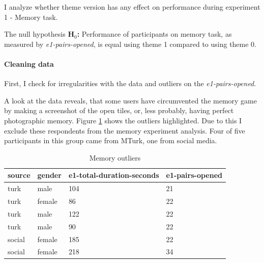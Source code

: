 		I analyze whether theme version has any effect on performance during experiment 1 - Memory task.
		
		The null hypothesis \textbf{H$_{0}$:} Performance of participants on memory task, as measured by \textit{e1-pairs-opened}, is equal using theme 1 compared to using theme 0.
	
		\paragraph{Cleaning data} %
		
		First, I check for irregularities with the data and outliers on the \textit{e1-pairs-opened}.
		
		A look at the data reveals, that some users have circumvented the memory game by making a screenshot of the open tiles, or, less probably, having perfect photographic memory. Figure \ref{tbl:e1-pairs-opened} shows the outliers highlighted. Due to this I exclude these respondents from the memory experiment analysis. Four of five participants in this group came from MTurk, one from social media.
		
		\begin{table}[]
			\begin{center}
				\begin{tabular}{|l|l|l|l|}
					\hline 
					source & gender & e1-total-duration-seconds & e1-pairs-opened \rule[-2ex]{0pt}{6ex} \\ \hline \hline
					turk   & male   & 104                          & \cellcolor[HTML]{FFFFC7}21                \\ \hline
					turk   & female & 86                           & \cellcolor[HTML]{FFFFC7}22                \\ \hline
					turk   & male   & 122                          & \cellcolor[HTML]{FFFFC7}22                \\ \hline
					turk   & male   & 90                           & \cellcolor[HTML]{FFFFC7}22                \\ \hline
					social & female & 185                          & \cellcolor[HTML]{FFFFC7}22                \\ \hline
					social & female & 218                          & 34                \\ \hline
				\end{tabular}
			\end{center}
			\caption{Memory outliers}
			\label{tbl:e1-pairs-opened}
		\end{table}
	
